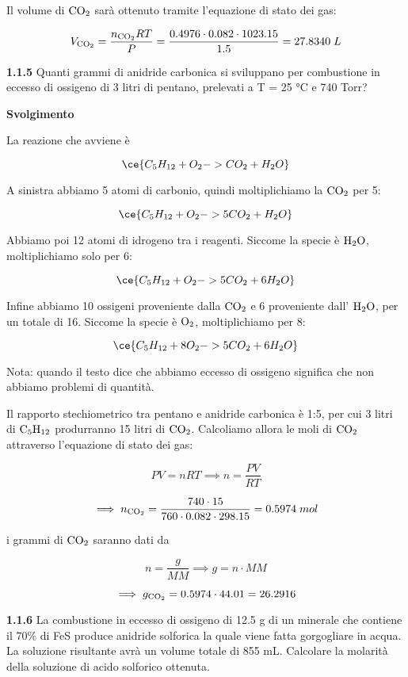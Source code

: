 Il volume di $\rm CO_2$ sarà ottenuto tramite l'equazione di stato dei gas:

$$V_{\rm CO_2}=\frac{n_{\rm CO_2}RT}{P}
=\frac{0.4976 \cdot 0.082 \cdot 1023.15}{1.5}=27.8340\;L$$

\vspace{0.2cm}\textbf{1.1.5} Quanti grammi di anidride carbonica si sviluppano per combustione in eccesso di ossigeno di 3 litri di pentano, prelevati a T = 25 °C e 740 Torr?

\vspace{0.2cm}\large\textbf{Svolgimento}\normalsize

\vspace{0.2cm}La reazione che avviene è

$$\ce{ C_5H_{12} + O_2 -> CO_2 + H_2O}$$

A sinistra abbiamo 5 atomi di carbonio, quindi moltiplichiamo la $\rm CO_2$ per 5:

$$\ce{ C_5H_{12} + O_2 -> 5CO_2 + H_2O}$$

Abbiamo poi 12 atomi di idrogeno tra i reagenti. Siccome la specie è $\rm H_2O$, moltiplichiamo solo per 6:

$$\ce{ C_5H_{12} + O_2 -> 5CO_2 + 6H_2O}$$

Infine abbiamo 10 ossigeni proveniente dalla $\rm CO_2$ e 6 proveniente dall' $\rm H_2O$, per un totale di 16. Siccome la specie è $\rm O_2$, moltiplichiamo per 8:

$$\ce{ C_5H_{12} + 8O_2 -> 5CO_2 + 6H_2O}$$

Nota: quando il testo dice che abbiamo eccesso di ossigeno significa che non abbiamo problemi di quantità.

\vspace{0.2cm}Il rapporto stechiometrico tra pentano e anidride carbonica è 1:5, per cui 3 litri di $\rm C_5H_{12}$ produrranno 15 litri di $\rm CO_2$. Calcoliamo allora le moli di $\rm CO_2$ attraverso l'equazione di stato dei gas:

$$PV=nRT
\implies
n=\frac{PV}{RT}$$

$$\implies n_{\rm CO_2}
=\frac{740 \cdot 15}{760 \cdot 0.082 \cdot 298.15}
=0.5974\;mol$$

i grammi di $\rm CO_2$ saranno dati da

$$n=\frac{g}{MM}
\implies
g=n \cdot MM$$

$$\implies g_{\rm CO_2}=0.5974 \cdot 44.01=26.2916$$

\vspace{0.2cm}\textbf{1.1.6} La combustione in eccesso di ossigeno di 12.5 g di un minerale che contiene il 70\% di FeS
produce anidride solforica la quale viene fatta gorgogliare in acqua. La soluzione risultante avrà un
volume totale di 855 mL. Calcolare la molarità della soluzione di acido solforico ottenuta.

